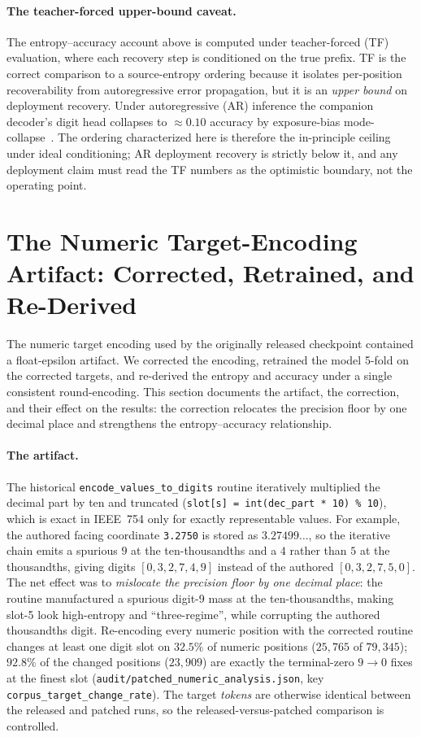 \documentclass[entropy,article,submit,moreauthors,pdftex]{Definitions/mdpi}
\begin{document}
\paragraph{The teacher-forced upper-bound caveat.} The entropy--accuracy account above is computed under teacher-forced (TF) evaluation, where each recovery step is conditioned on the true prefix. TF is the correct comparison to a source-entropy ordering because it isolates per-position recoverability from autoregressive error propagation, but it is an \emph{upper bound} on deployment recovery. Under autoregressive (AR) inference the companion decoder's digit head collapses to $\approx\!0.10$ accuracy by exposure-bias mode-collapse~\cite{paperA_decoder}. The ordering characterized here is therefore the in-principle ceiling under ideal conditioning; AR deployment recovery is strictly below it, and any deployment claim must read the TF numbers as the optimistic boundary, not the operating point.

\section{The Numeric Target-Encoding Artifact: Corrected, Retrained, and Re-Derived}
\label{sec:float-epsilon}

The numeric target encoding used by the originally released checkpoint contained a float-epsilon artifact. We corrected the encoding, retrained the model 5-fold on the corrected targets, and re-derived the entropy and accuracy under a single consistent round-encoding. This section documents the artifact, the correction, and their effect on the results: the correction relocates the precision floor by one decimal place and strengthens the entropy--accuracy relationship.

\paragraph{The artifact.} The historical \texttt{encode\_values\_to\_digits} routine iteratively multiplied the decimal part by ten and truncated (\texttt{slot[s] = int(dec\_part * 10) \% 10}), which is exact in IEEE~754 only for exactly representable values. For example, the authored facing coordinate \texttt{3.2750} is stored as $3.27499\ldots$, so the iterative chain emits a spurious $9$ at the ten-thousandths and a $4$ rather than $5$ at the thousandths, giving digits $[0,3,2,7,4,9]$ instead of the authored $[0,3,2,7,5,0]$. The net effect was to \emph{mislocate the precision floor by one decimal place}: the routine manufactured a spurious digit-9 mass at the ten-thousandths, making slot-5 look high-entropy and ``three-regime'', while corrupting the authored thousandths digit. Re-encoding every numeric position with the corrected routine changes at least one digit slot on $32.5\%$ of numeric positions ($25{,}765$ of $79{,}345$); $92.8\%$ of the changed positions ($23{,}909$) are exactly the terminal-zero $9\to0$ fixes at the finest slot (\texttt{audit/patched\_numeric\_analysis.json}, key \texttt{corpus\_target\_change\_rate}). The target \emph{tokens} are otherwise identical between the released and patched runs, so the released-versus-patched comparison is controlled.
\end{document}
